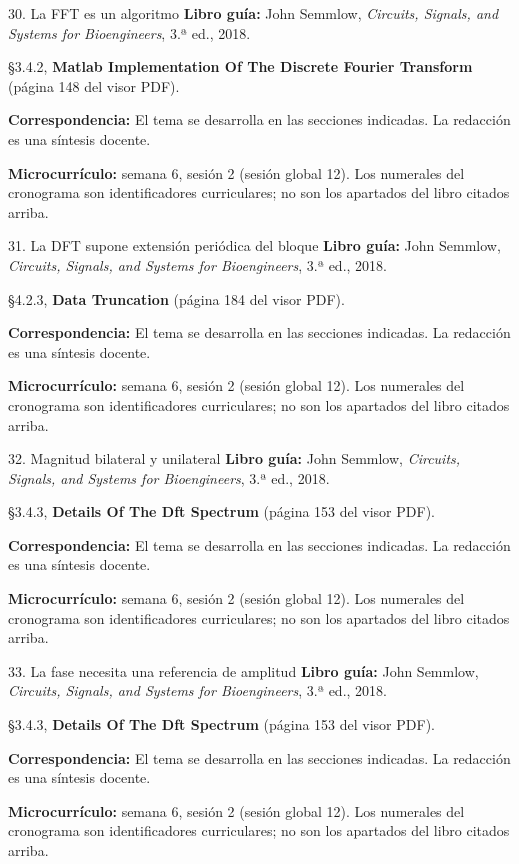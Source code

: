 \documentclass[
  10pt,
  ignorenonframetext,
  aspectratio=169,
  spanish,
]{beamer}
\begin{document}
\begin{frame}{30. La FFT es un algoritmo}
\label{la-fft-es-un-algoritmo}
\textbf{Libro guía:} John Semmlow, \emph{Circuits, Signals, and Systems
for Bioengineers}, 3.ª ed., 2018.

§3.4.2, \textbf{Matlab Implementation Of The Discrete Fourier Transform}
(página 148 del visor PDF).

\textbf{Correspondencia:} El tema se desarrolla en las secciones
indicadas. La redacción es una síntesis docente.

\textbf{Microcurrículo:} semana 6, sesión 2 (sesión global 12). Los
numerales del cronograma son identificadores curriculares; no son los
apartados del libro citados arriba.
\end{frame}

\begin{frame}{31. La DFT supone extensión periódica del bloque}
\label{la-dft-supone-extensiuxf3n-periuxf3dica-del-bloque}
\textbf{Libro guía:} John Semmlow, \emph{Circuits, Signals, and Systems
for Bioengineers}, 3.ª ed., 2018.

§4.2.3, \textbf{Data Truncation} (página 184 del visor PDF).

\textbf{Correspondencia:} El tema se desarrolla en las secciones
indicadas. La redacción es una síntesis docente.

\textbf{Microcurrículo:} semana 6, sesión 2 (sesión global 12). Los
numerales del cronograma son identificadores curriculares; no son los
apartados del libro citados arriba.
\end{frame}

\begin{frame}{32. Magnitud bilateral y unilateral}
\label{magnitud-bilateral-y-unilateral}
\textbf{Libro guía:} John Semmlow, \emph{Circuits, Signals, and Systems
for Bioengineers}, 3.ª ed., 2018.

§3.4.3, \textbf{Details Of The Dft Spectrum} (página 153 del visor PDF).

\textbf{Correspondencia:} El tema se desarrolla en las secciones
indicadas. La redacción es una síntesis docente.

\textbf{Microcurrículo:} semana 6, sesión 2 (sesión global 12). Los
numerales del cronograma son identificadores curriculares; no son los
apartados del libro citados arriba.
\end{frame}

\begin{frame}{33. La fase necesita una referencia de amplitud}
\label{la-fase-necesita-una-referencia-de-amplitud}
\textbf{Libro guía:} John Semmlow, \emph{Circuits, Signals, and Systems
for Bioengineers}, 3.ª ed., 2018.

§3.4.3, \textbf{Details Of The Dft Spectrum} (página 153 del visor PDF).

\textbf{Correspondencia:} El tema se desarrolla en las secciones
indicadas. La redacción es una síntesis docente.

\textbf{Microcurrículo:} semana 6, sesión 2 (sesión global 12). Los
numerales del cronograma son identificadores curriculares; no son los
apartados del libro citados arriba.
\end{frame}
\end{document}

